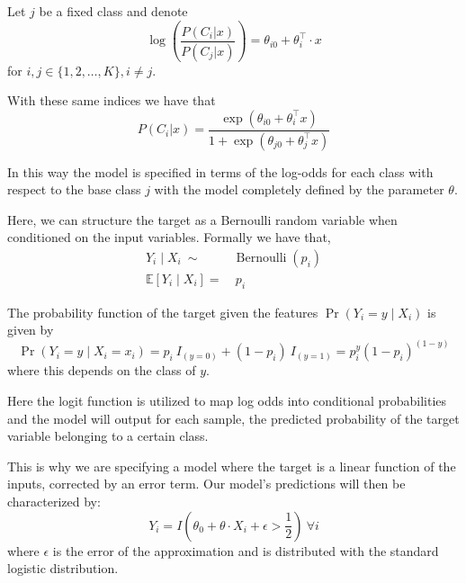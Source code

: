 Let $j$ be a fixed class and denote
\begin{equation}
 \log \left( \frac{P(C_i|x)}{P(C_j|x)} \right) = \theta_{i0} + \theta_i^\intercal \cdot x
 \label{logit-logOddss}
 \end{equation}
for $i,j \in \{1,2,\ldots,K\}, i \neq j$.

With these same indices we have that
\begin{equation} P(C_i|x) = \frac{\exp(\theta_{i0} + \theta_i^\intercal x)}{1 + \exp(\theta_{j0} + \theta_j^\intercal x)}
\end{equation}

In this way the model is specified in terms of the log-odds for each class with respect to the base class $j$ with the model completely defined by the parameter $\theta$.

Here, we can structure the target as a Bernoulli random variable when conditioned on the input variables.
Formally we have that,
\begin{equation}
\begin{split}
Y_i \mid X_i \ \sim & \operatorname{Bernoulli}(p_i) \\
\mathbb{E}[Y_i \mid X_i ] = & \ p_i
\end{split}
\end{equation}


The probability function of the target given the features $\Pr(Y_i=y\mid X_i)$ is given by
\begin{equation}
\Pr(Y_i=y \mid X_i = x_i) = p_i \ I_{(y=0)} + (1-p_i) \ I_{(y=1)}  = p_i^{y} {(1-p_i)}^{(1-y)}
\label{logit-probabilityDensity}
\end{equation}
where this depends on the class of $y$.

Here the logit function is utilized to map log odds into conditional probabilities and the model will output for each sample, the predicted probability of the target variable belonging to a certain class.

This is why we are specifying a model where the target is a linear function of the inputs, corrected by an error term.
Our model's predictions will then be characterized by:
\begin{equation}
Y_i = I(\theta_0 + \theta \cdot X_i + \epsilon > \frac{1}{2}) \ \forall i
\label{logit-indicatorFunction}
\end{equation}
where $\epsilon$ is the error of the approximation and is distributed with the standard logistic distribution.

